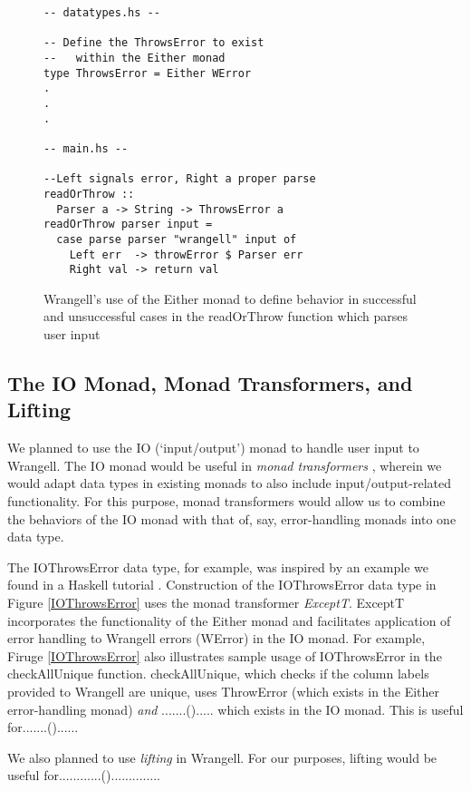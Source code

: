 \documentclass[preprint,nocopyrightspace]{sig-alternate}
\begin{document}
\begin{figure}
\begin{lstlisting}
-- datatypes.hs --

-- Define the ThrowsError to exist 
--   within the Either monad
type ThrowsError = Either WError
.
.
.

-- main.hs --

--Left signals error, Right a proper parse
readOrThrow :: 
  Parser a -> String -> ThrowsError a
readOrThrow parser input = 
  case parse parser "wrangell" input of
    Left err  -> throwError $ Parser err
    Right val -> return val 

\end{lstlisting}
\caption{Wrangell's use of the Either monad to define behavior in successful and unsuccessful cases in the readOrThrow function which parses user input}
\label{eitherThrowError0}
\end{figure}

\subsection{The IO Monad, Monad Transformers, and Lifting}
We planned to use the IO (`input/output') monad to handle user input to Wrangell. The IO monad would be useful in \emph{monad transformers} \cite{monadTransform}, wherein we would adapt data types in existing monads to also include input/output-related functionality. For this purpose, monad transformers would allow us to combine the behaviors of the IO monad with that of, say, error-handling monads into one data type. 

The IOThrowsError data type, for example, was inspired by an example we found in a Haskell tutorial \cite{writeScheme48}. Construction of the IOThrowsError data type in Figure \ref{IOThrowsError} uses the monad transformer \emph{ExceptT}. ExceptT incorporates the functionality of the Either monad and facilitates application of error handling to Wrangell errors (WError) in the IO monad. For example, Firuge \ref{IOThrowsError} also illustrates sample usage of IOThrowsError in the checkAllUnique function. checkAllUnique, which checks if the column labels provided to Wrangell are unique, uses ThrowError (which exists in the Either error-handling monad) \emph{and} .......()..... which exists in the IO monad. This is useful for.......()......

We also planned to use \emph{lifting} in Wrangell. For our purposes, lifting would be useful for............()..............
\end{document}
